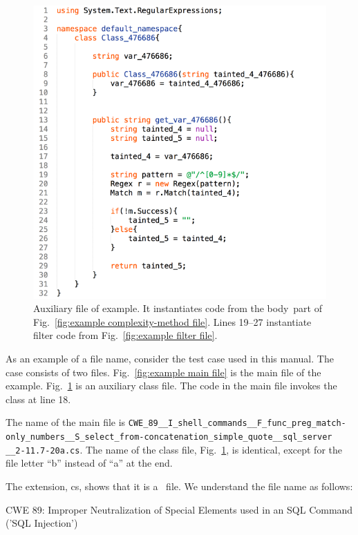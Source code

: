 \begin{figure}[htbp]
  \includegraphics[width=0.85\linewidth]{fig_example_code2.png}
  \caption{Auxiliary file of example.  It instantiates code from the
    \texlangle body\texrangle\ part of Fig.~\ref{fig:example complexity-method file}.
    Lines 19--27 instantiate filter code
    from Fig.~\ref{fig:example filter file}.}
  \label{fig:example aux file}
\end{figure}

As an example of a file name, consider the test case used in this manual.  The case
consists of
two files.
Fig.~\ref{fig:example main file} is the main file of the example.  
Fig.~\ref{fig:example aux file} is an auxiliary class file.  
The code in
the main file invokes the class at line 18.

The name of the main file is
\verb|CWE_89__I_shell_commands__F_func_preg_match-| \\
\verb|only_numbers__S_select_from-concatenation_simple_quote__sql_server| \\
\verb|__2-11.7-20a.cs|.
The name of the class file, Fig.~\ref{fig:example aux file}, is
identical, except for the
file letter ``b'' instead of ``a'' at the end.

The extension, cs, shows that it is a \CSharp\ file.
We understand the file name as follows:

\noindent CWE 89: Improper Neutralization of Special Elements used in an SQL Command
('SQL Injection') \cite{CWE89}

